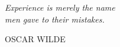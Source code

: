 

\frontmatter %

\pagestyle{plain} %


\maketitlepage

\clearpage

\thispagestyle{empty}
\null\vfill

\settowidth{}
\centering
\parbox{\longest}{%
  \raggedright{\huge\itshape%
   Experience is merely the name \\ 
   men gave to their mistakes.\par\bigskip
  }   
  \raggedleft\Large\MakeUppercase{Oscar Wilde}\par%
}

\vfill\vfill

\clearpage
\raggedright


